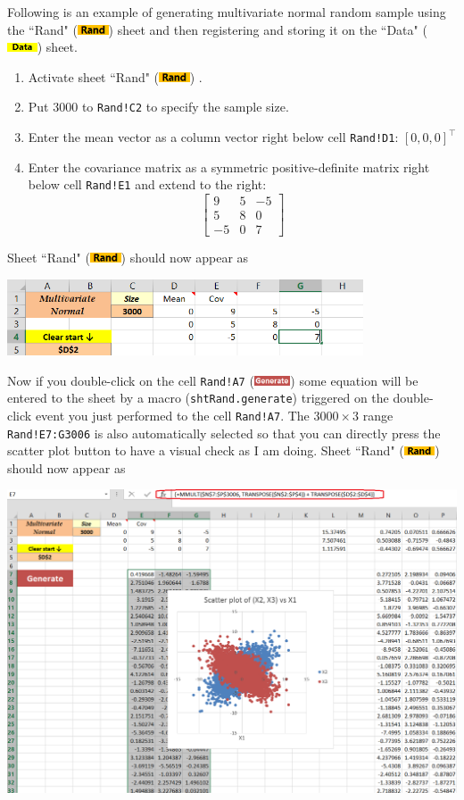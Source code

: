 \documentclass[article]{jss}
\numberwithin{equation}{subsection}
\newcommand{\shtData}{``Data" (\includegraphics[height=8pt, keepaspectratio=true]{DataSheetTab_png}) }
\newcommand{\shtRand}{``Rand" (\includegraphics[height=8pt, keepaspectratio=true]{RandSheetTab_png}) }
\begin{document}
        Following is an example of generating multivariate normal random sample using the \shtRand sheet and then registering and storing it on the \shtData sheet. \\
        \begin{enumerate}
        \item Activate sheet \shtRand.
        \item Put 3000 to \texttt{Rand!C2} to specify the sample size.
        \item Enter the mean vector as a column vector right below cell \texttt{Rand!D1}: $[0,0,0]^\intercal$
        \item Enter the covariance matrix as a symmetric positive-definite matrix right below cell \texttt{Rand!E1} and extend to the right:  
        \[\left[ {\begin{array}{*{20}{c}}
        9&5&-5 \\ 
        5&8&0 \\ 
        -5&0&7 
        \end{array}} \right]\]
        \end{enumerate}
        Sheet \shtRand should now appear as
        \begin{center}
	        \includegraphics[height=64pt, keepaspectratio=true]{RandSheetAfterInput_png}
        \end{center}
        Now if you double-click on the cell \texttt{Rand!A7} (\includegraphics[height=8pt, keepaspectratio=true]{RandSheet_GenerateButton_png}) some equation will be entered to the sheet by a  macro (\texttt{shtRand.generate}) triggered on the double-click event you just performed to the cell \texttt{Rand!A7}. The $3000\times 3$ range \texttt{Rand!E7:G3006} is also automatically selected so that you can directly press the scatter plot button to have a visual check as I am doing. Sheet \shtRand should now appear as
        \begin{center}
	        \includegraphics[width=\linewidth, keepaspectratio=true]{RandSheetOutput_png}
        \end{center}
\end{document}
